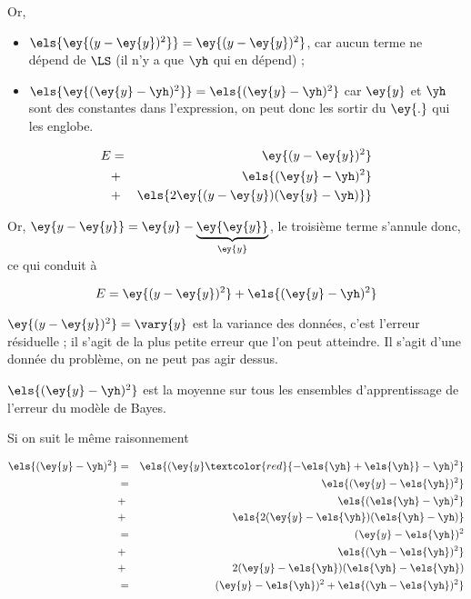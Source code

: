 	Or,
	
	\begin{itemize}
		\item $\els{\ey{(y - \ey{y})^2}} = \ey{(y - \ey{y})^2}$, car aucun terme ne dépend de $\LS$ (il n'y a que $\yh$ qui en dépend) ;
		\item $\els{\ey{(\ey{y} - \yh)^2}} = \els{(\ey{y} - \yh)^2}$ car $\ey{y}$ et $\yh$ sont des constantes dans l'expression, on peut donc les sortir du $\ey{.}$ qui les englobe.
	\end{itemize}
	
	\begin{eqnarray*}
  	E & = & \ey{(y - \ey{y})^2} \\
  	 & + & \els{(\ey{y} - \yh)^2} \\
  	 & + & \els{2\ey{(y - \ey{y})(\ey{y} - \yh)}}
	\end{eqnarray*}
	
	Or, $\ey{y - \ey{y}} = \ey{y} - \underbrace{\ey{\ey{y}}}_{\ey{y}}$, le troisième terme s'annule donc, ce qui conduit à
	
	$$E =\ey{(y - \ey{y})^2} + \els{(\ey{y} - \yh)^2}$$
	
	$\ey{(y - \ey{y})^2} = \vary{y}$ est la variance des données, c'est l'erreur résiduelle ; il s'agit de la plus petite erreur que l'on peut atteindre. Il s'agit d'une donnée du problème, on ne peut pas agir dessus.
	
	$\els{(\ey{y} - \yh)^2}$ est la moyenne sur tous les ensembles d'apprentissage de l'erreur du modèle de Bayes.
	
	
	Si on suit le même raisonnement
	
	\begin{eqnarray*}
  	\els{(\ey{y} - \yh)^2} & = & \els{(\ey{y} \textcolor{red}{- \els{\yh} + \els{\yh}} - \yh)^2} \\
  	 & = & \els{(\ey{y} - \els{\yh})^2} \\
  	 & + & \els{(\els{\yh} - \yh)^2} \\
  	 & + & \els{2(\ey{y} - \els{\yh})(\els{\yh} - \yh)} \\
  	 & = & (\ey{y} - \els{\yh})^2 \\
  	 & + & \els{(\yh - \els{\yh})^2} \\
  	 & + & 2(\ey{y} - \els{\yh})(\els{\yh} - \els{\yh}) \\
  	 & = & (\ey{y} - \els{\yh})^2 + \els{(\yh - \els{\yh})^2}
	\end{eqnarray*}
	

